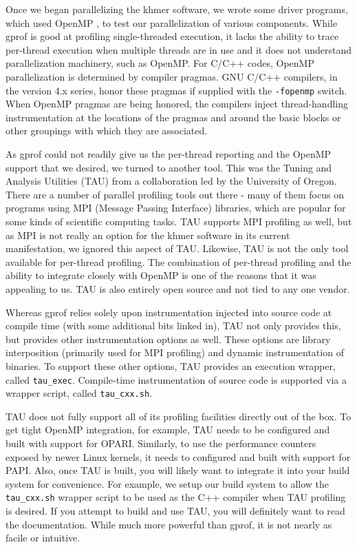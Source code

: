 \documentclass{article}
\begin{document}
Once we began parallelizing the khmer software, we wrote some driver programs, which used OpenMP \citep{web:OpenMP}, to test our parallelization of various components. While gprof is good at profiling single-threaded execution, it lacks the ability to trace per-thread execution when multiple threads are in use and it does not understand parallelization machinery, such as OpenMP. For C/C++ codes, OpenMP parallelization is determined by compiler pragmas. GNU C/C++ compilers, in the version 4.x series, honor these pragmas if supplied with the \texttt{-fopenmp} switch. When OpenMP pragmas are being honored, the compilers inject thread-handling instrumentation at the locations of the pragmas and around the basic blocks or other groupings with which they are associated.

As gprof could not readily give us the per-thread reporting and the OpenMP support that we desired, we turned to another tool. This was the Tuning and Analysis Utilities (TAU) \citep{web:TAU} from a collaboration led by the University of Oregon. There are a number of parallel profiling tools out there - many of them focus on programs using MPI (Message Passing Interface) libraries, which are popular for some kinds of scientific computing tasks. TAU supports MPI profiling as well, but as MPI is not really an option for the khmer software in its current manifestation, we ignored this aspect of TAU. Likewise, TAU is not the only tool available for per-thread profiling. The combination of per-thread profiling and the ability to integrate closely with OpenMP is one of the reasons that it was appealing to us. TAU is also entirely open source and not tied to any one vendor.

Whereas gprof relies solely upon instrumentation injected into source code at compile time (with some additional bits linked in), TAU not only provides this, but provides other instrumentation options as well. These options are library interposition (primarily used for MPI profiling) and dynamic instrumentation of binaries. To support these other options, TAU provides an execution wrapper, called \texttt{tau\_exec}. Compile-time instrumentation of source code is supported via a wrapper script, called \texttt{tau\_cxx.sh}.

TAU does not fully support all of its profiling facilities directly out of the box. To get tight OpenMP integration, for example, TAU needs to be configured and built with support for OPARI. Similarly, to use the performance counters exposed by newer Linux kernels, it needs to configured and built with support for PAPI. Also, once TAU is built, you will likely want to integrate it into your build system for convenience. For example, we setup our build system to allow the \texttt{tau\_cxx.sh} wrapper script to be used as the C++ compiler when TAU profiling is desired. If you attempt to build and use TAU, you will definitely want to read the documentation. While much more powerful than gprof, it is not nearly as facile or intuitive.
\end{document}
